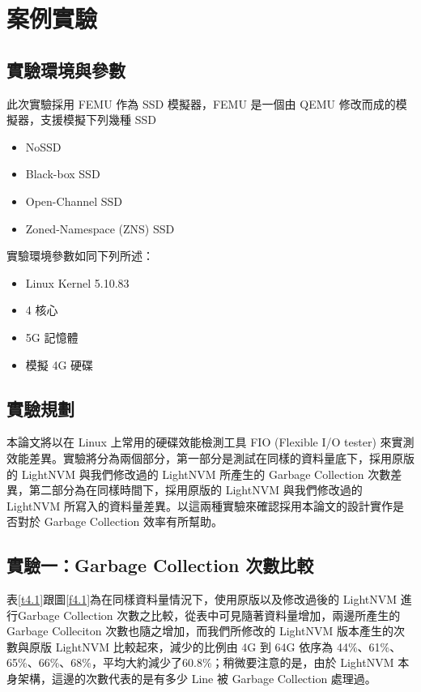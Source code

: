 \chapter{案例實驗}
\section{實驗環境與參數}
此次實驗採用 FEMU 作為 SSD 模擬器，FEMU 是一個由 QEMU \cite{bellard2005qemu}修改而成的模擬器\cite{210518}，支援模擬下列幾種 SSD
\begin{itemize}
    \item NoSSD
    \item Black-box SSD
    \item Open-Channel SSD
    \item Zoned-Namespace (ZNS) SSD
\end{itemize}
實驗環境參數如同下列所述：
\begin{itemize}
    \item Linux Kernel 5.10.83
    \item 4 核心
    \item 5G 記憶體
    \item 模擬 4G 硬碟
\end{itemize}

\section{實驗規劃}
\indent
本論文將以在 Linux 上常用的硬碟效能檢測工具 FIO (Flexible I/O tester) 來實測效能差異。實驗將分為兩個部分，第一部分是測試在同樣的資料量底下，採用原版的 LightNVM 與我們修改過的 LightNVM 所產生的 Garbage Collection 次數差異，第二部分為在同樣時間下，採用原版的 LightNVM 與我們修改過的 LightNVM 所寫入的資料量差異。以這兩種實驗來確認採用本論文的設計實作是否對於 Garbage Collection 效率有所幫助。

\section{實驗一：Garbage Collection 次數比較}\label{s4.2}

\indent
表\ref{t4.1}跟圖\ref{f4.1}為在同樣資料量情況下，使用原版以及修改過後的 LightNVM 進行Garbage Collection 次數之比較，從表中可見隨著資料量增加，兩邊所產生的 Garbage Colleciton 次數也隨之增加，而我們所修改的 LightNVM 版本產生的次數與原版 LightNVM 比較起來，減少的比例由 4G 到 64G 依序為 44\%、61\%、65\%、66\%、68\%，平均大約減少了60.8\%；稍微要注意的是，由於 LightNVM 本身架構，這邊的次數代表的是有多少 Line 被 Garbage Collection 處理過。

